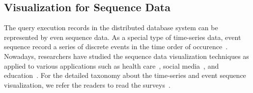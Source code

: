 





\subsection{Visualization for Sequence Data}
The query execution records in the distributed database system can be represented by even sequence data.
As a special type of time-series data, event sequence record a series of discrete events in the time order of occurence~\cite{guo2020survey}. 
Nowadays, researchers have studied the sequence data visualization techniques as applied to various applications such as health care~\cite{malik2015cohort, wongsuphasawat2011outflow}, social media~\cite{zhao2014fluxflow, law2018maqui}, and education~\cite{chen2015peakvizor, mu2019moocad, goulden2019ccvis, he2019vuc, chen2018viseq}.
For the detailed taxonomy about the time-series and event sequence visualization, we refer the readers to read the surveys~\cite{guo2020survey, silva2000visualization}. 


